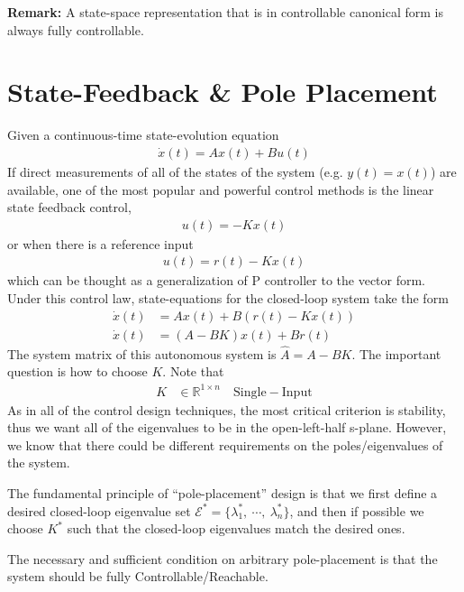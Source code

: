 \documentclass[twoside]{article}
\begin{document}
\textbf{Remark:} A state-space representation that is
in controllable canonical form is always fully controllable.

\newpage

\section{State-Feedback \& Pole Placement}

Given a continuous-time state-evolution equation
%
\begin{align*}
  \dot{x}(t) = A x(t) + B u(t)
\end{align*}
%
If direct measurements of all of the states of the
system (e.g. $y(t) = x(t)$) are available, one of the most
popular and powerful control methods is the linear state feedback
control,
%
\begin{align*}
 u(t) = - K x(t)
\end{align*}
%
or when there is a reference input 
%
\begin{align*}
 u(t) = r(t) - K x(t)
\end{align*}
%
which can be thought as a generalization of P controller
to the vector form. Under this control law, state-equations
for the closed-loop system take the form
%
\begin{align*}
  \dot{x}(t) &= A x(t) + B \left( r(t) - K x(t) \right)
  \\
  \dot{x}(t) &= \left( A - B K \right) x(t) + B r(t) 
\end{align*}
%
The system matrix of this autonomous system is
$\hat{A} = A - B K$. 
%
The important question is how to choose $K$. Note that 
%
\begin{align*}
  K &\in \mathbb{R}^{1 \times n} \quad \mathrm{Single-Input} 
\end{align*}
%
As in all of the control design techniques, the most critical criterion
is stability, thus we want all of the eigenvalues to be in the
open-left-half s-plane. However, we know that there could be 
different requirements on the poles/eigenvalues of the system.

The fundamental principle of ``pole-placement'' design is that
we first define a desired closed-loop eigenvalue set 
$\mathcal{E}^* = \lbrace \lambda_1^* , \ \cdots, \  \lambda_n^* \rbrace$, and
then if possible we choose $K^*$ such that the closed-loop
eigenvalues match the desired ones.

The necessary and sufficient condition on arbitrary pole-placement
is that the system should be fully Controllable/Reachable.
\end{document}
